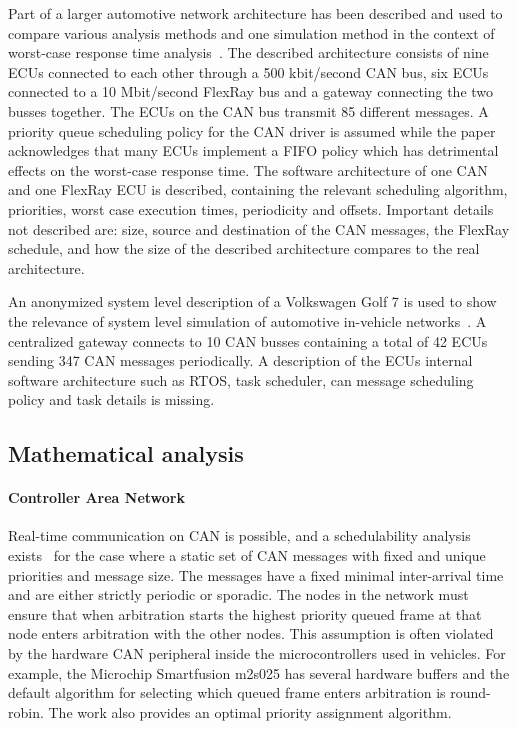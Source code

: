Part of a larger automotive network architecture has been described and used to compare various analysis methods and one simulation method in the context of worst-case response time analysis~\cite{kollman2010comparative}. The described architecture consists of nine ECUs connected to each other through a 500 kbit/second CAN bus, six ECUs connected to a 10 Mbit/second FlexRay bus and a gateway connecting the two busses together. The ECUs on the CAN bus transmit 85 different messages. A priority queue scheduling policy for the CAN driver is assumed while the paper acknowledges that many ECUs implement a FIFO policy which has detrimental effects on the worst-case response time. The software architecture of one CAN and one FlexRay ECU is described, containing the relevant scheduling algorithm, priorities, worst case execution times, periodicity and offsets. Important details not described are: size, source and destination of the CAN messages, the FlexRay schedule, and how the size of the described architecture compares to the real architecture. 

An anonymized system level description of a Volkswagen Golf 7 is used to show the relevance of system level simulation of automotive in-vehicle networks~\cite{meyer2019simulation}. A centralized gateway connects to 10 CAN busses containing a total of 42 ECUs sending 347 CAN messages periodically. A description of the ECUs internal software architecture such as RTOS, task scheduler, can message scheduling policy and task details is missing. 

\subsection{Mathematical analysis}
\paragraph{Controller Area Network}
Real-time communication on CAN is possible, and a schedulability analysis exists~\cite{davis2007controller} for the case where a static set of CAN messages with fixed and unique priorities and message size. The messages have a fixed minimal inter-arrival time and are either strictly periodic or sporadic. The nodes in the network must ensure that when arbitration starts the highest priority queued frame at that node enters arbitration with the other nodes. This assumption is often violated by the hardware CAN peripheral inside the microcontrollers used in vehicles. For example, the Microchip Smartfusion m2s025 has several hardware buffers and the default algorithm for selecting which queued frame enters arbitration is round-robin. The work also provides an optimal priority assignment algorithm.

